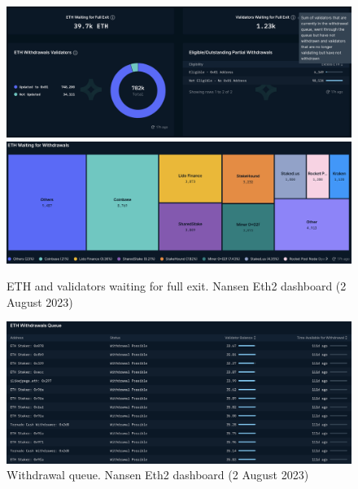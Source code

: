 \documentclass[UTF8]{article}
\begin{document}
{\begin{figure}[htbp]
\begin{center}
\includegraphics[width=\linewidth]{images/nansen10}\\
\includegraphics[width=\linewidth]{images/nansen11}
\caption{ETH and validators waiting for full exit. Nansen Eth2 dashboard (2 August 2023)}
\label{fig:nansen10}
\end{center}
\end{figure}

\begin{figure}[htbp]
\begin{center}
\includegraphics[width=\linewidth]{images/nansen12}
\caption{Withdrawal queue. Nansen Eth2 dashboard (2 August 2023)}
\label{fig:nansen12}
\end{center}
\end{figure}

}
\end{document}
